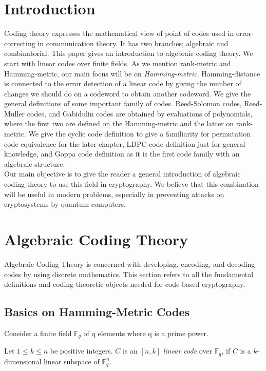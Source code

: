 \section{Introduction}
Coding theory expresses the mathematical view of point of codes used in error-correcting in communication theory. It has two branches; algebraic and combinatorial. This paper gives an introduction to algebraic coding theory. We start with linear codes over finite fields. As we mention rank-metric and Hamming-metric, our main focus will be on \textit{Hamming-metric}. Hamming-distance is connected to the error detection of a linear code by giving the number of changes we should do on a codeword to obtain another codeword. We give the general definitions of some important family of codes. Reed-Solomon codes, Reed-Muller codes, and Gabidulin codes are obtained by evaluations of polynomials, where the first two are defined on the Hamming-metric and the latter on rank-metric. We give the cyclic code definition to give a familiarity for permutation code equivalence for the later chapter, LDPC code definition just for general knowledge, and Goppa code definition as it is the first code family with an algebraic structure.\\
Our main objective is to give the reader a general introduction of algebraic coding theory to use this field in cryptography. We believe that this combination will be useful in modern problems, especially in preventing attacks on cryptosystems by quantum computers.  

\section{Algebraic Coding Theory}
\label{sec:algeb_coding}
Algebraic Coding Theory is concerned with developing, encoding, and decoding codes by using discrete mathematics. This section refers to all the fundamental definitions and coding-theoretic objects needed for code-based cryptography. 

\subsection{Basics on Hamming-Metric Codes}
Consider a finite field $\mathbb F_q$ of q elements where q is a prime power.
\begin{definition} Let $1 \leq k \leq n$ be positive integers. $C$ is an $[n, k]$ \textit{linear code} over $\mathbb F_q$, if $C$ is a $k$-dimensional linear subspace of $\mathbb F_q^n$.
\end{definition}

